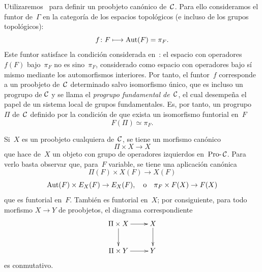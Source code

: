 Utilizaremos~ para definir un proobjeto canónico de~$\cal{C}$.
Para ello consideramos el funtor de~$\Gamma$ en la categoría de los espacios
topológicos
(e incluso de los grupos topológicos):
$$
f\colon F\mto\Aut(F)=\pi_F.
$$
Este funtor satisface la condición considerada en~: el espacio
con operadores~$f(F)$ bajo~$\pi_F$ no es sino~$\pi_F$, considerado como
espacio con operadores bajo sí mismo mediante los automorfismos interiores.
Por tanto, el funtor~$f$ corresponde a un proobjeto de~$\cal{C}$
determinado salvo isomorfismo único, que es incluso un progrupo de
$\cal{C}$ y se llama el \emph{progrupo fundamental de~$\cal{C}$},
%
el cual desempeña el papel de un sistema local de grupos fundamentales. Es,
por tanto, un progrupo~$\Pi$ de~$\cal{C}$ definido por la condición de que
exista un isomorfismo funtorial en~$F$
$$
F(\Pi)\simeq\pi_F.
$$

Si~$X$ es un proobjeto cualquiera de~$\cal{C}$, se tiene un morfismo
canónico
$$
\Pi\times X\to X
$$
que hace de~$X$ un objeto con grupo de operadores izquierdos
en~$\Prodash\cal{C}$. Para verlo basta observar que, para~$F$ variable, se
tiene una aplicación canónica
$$
\Pi(F)\times X(F)\to X(F)
$$
\ie
$$
\Aut(F)\times E_X(F)\to E_X(F),\quad\text{o}\quad
\pi_F\times F(X)\to F(X)
$$
que es funtorial en~$F$. También es funtorial en~$X$; por consiguiente, para
todo morfismo $X\to Y$ de proobjetos, el diagrama correspondiente
$$
\xymatrix{
\Pi\times X\ar[r]\ar[d]&X\ar[d]\\
\Pi\times Y\ar[r]&Y
}
$$
es conmutativo.

